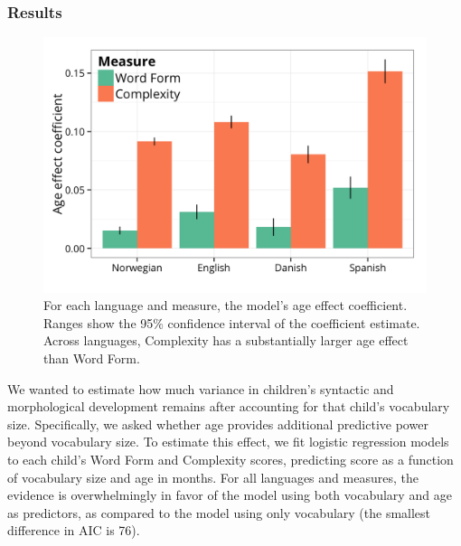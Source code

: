 \documentclass[10pt,letterpaper]{article}
\begin{document}

\subsubsection{Results}

\begin{figure}
\begin{center}
\includegraphics[width=\linewidth]{plots/grammar_coef_plot-1.png}
\end{center}
\caption{\label{fig:coefs_grammar} For each language and measure, the model's age effect coefficient. Ranges show the 95\% confidence interval of the coefficient estimate. Across languages, Complexity has a substantially larger age effect than Word Form.}
\end{figure}

\begin{figure}
\centering
{}
\end{figure}

We wanted to estimate how much variance in children's syntactic and morphological development remains after accounting for that child's vocabulary size. Specifically, we asked whether age provides additional predictive power beyond vocabulary size. To estimate this effect, we fit logistic regression models to each child's Word Form and Complexity scores, predicting score as a function of vocabulary size and age in months. For all languages and measures, the evidence is overwhelmingly in favor of the model using both vocabulary and age as predictors, as compared to the model using only vocabulary (the smallest difference in AIC is 76). %
\end{document}
